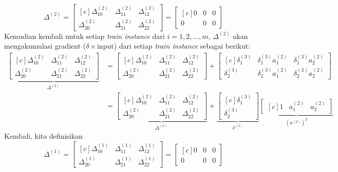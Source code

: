 \documentclass[12pt]{article}
\begin{document}
\begin{equation}
	\Delta^{(2)} = \begin{bmatrix}[c]
		\Delta_{10}^{(2)} & \Delta_{11}^{(2)} & \Delta_{12}^{(2)} \\
		\Delta_{20}^{(2)} & \Delta_{21}^{(2)} & \Delta_{22}^{(2)}		
	\end{bmatrix} = \begin{bmatrix}[c]
		0 & 0 & 0 \\
		0 & 0 & 0		
	\end{bmatrix}
\end{equation}
Kemudian kembali untuk setiap \textit{train instance} dari $i = 1, 2, \ldots, m$, $\Delta^{(2)}$ akan mengakumulasi gradient ($\delta \times \text{input}$) dari setiap \textit{train instance}  sebagai berikut:
\begin{align}
\underbrace{\begin{bmatrix}[c]
		\Delta_{10}^{(2)} & \Delta_{11}^{(2)} & \Delta_{12}^{(2)} \\
		\Delta_{20}^{(2)} & \Delta_{21}^{(2)} & \Delta_{22}^{(2)}		
	\end{bmatrix}}_{\Delta^{(2)}} &= \begin{bmatrix}[c]
		\Delta_{10}^{(2)} & \Delta_{11}^{(2)} & \Delta_{12}^{(2)} \\
		\Delta_{20}^{(2)} & \Delta_{21}^{(2)} & \Delta_{22}^{(2)}		
	\end{bmatrix} + \begin{bmatrix}[c]
		\delta_1^{(3)} & \delta_1^{(3)} a_1^{(2)} & \delta_1^{(3)} a_2^{(2)} \\
		\delta_2^{(3)} & \delta_2^{(3)} a_1^{(2)} & \delta_2^{(3)} a_2^{(2)}
	\end{bmatrix}	\\
	              &= \underbrace{\begin{bmatrix}[c]
		\Delta_{10}^{(2)} & \Delta_{11}^{(2)} & \Delta_{12}^{(2)} \\
		\Delta_{20}^{(2)} & \Delta_{21}^{(2)} & \Delta_{22}^{(2)}		
	\end{bmatrix}}_{\Delta^{(2)}} + \underbrace{\begin{bmatrix}[c]
		\delta_1^{(3)} \\
		\delta_2^{(3)}
	\end{bmatrix}}_{\delta^{(3)}}  \underbrace{\begin{bmatrix}[c]
		1 & a_1^{(2)} & a_2^{(2)}
	\end{bmatrix}}_{(a^{(2)})^T} 
\end{align}
Kembali, kita definisikan 
\begin{equation}
	\Delta^{(1)} = \begin{bmatrix}[c]
		\Delta_{10}^{(1)} & \Delta_{11}^{(1)} & \Delta_{12}^{(1)} \\
		\Delta_{20}^{(1)} & \Delta_{21}^{(1)} & \Delta_{22}^{(1)}		
	\end{bmatrix} = \begin{bmatrix}[c]
		0 & 0 & 0 \\
		0 & 0 & 0		
	\end{bmatrix}
\end{equation}
\end{document}
